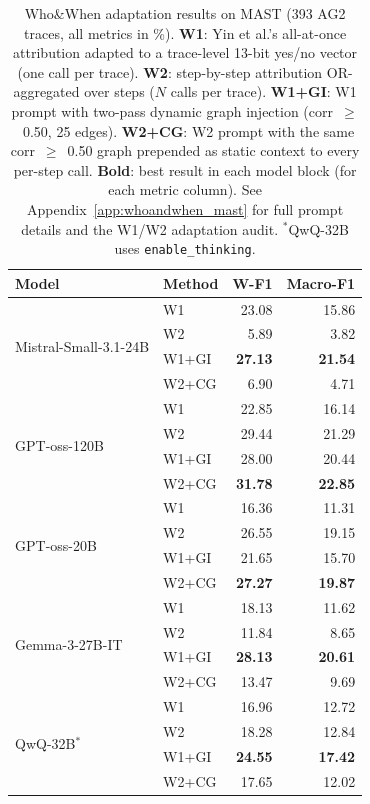 \begin{table}[t]
\centering
\small
\setlength{\tabcolsep}{8pt}
\renewcommand{\arraystretch}{1.2}
\begin{tabular}{l l rr}
\toprule
\textbf{Model} & \textbf{Method} & \textbf{W-F1} & \textbf{Macro-F1} \\
\midrule
\multirow{4}{*}{Mistral-Small-3.1-24B}
  & W1     & 23.08              & 15.86              \\
  & W2     &  5.89              &  3.82              \\
  & W1+GI  & \textbf{27.13}     & \textbf{21.54}     \\
  & W2+CG  &  6.90              &  4.71              \\[3pt]
\multirow{4}{*}{GPT-oss-120B}
  & W1     & 22.85              & 16.14              \\
  & W2     & 29.44              & 21.29              \\
  & W1+GI  & 28.00              & 20.44              \\
  & W2+CG  & \textbf{31.78}     & \textbf{22.85}     \\[3pt]
\multirow{4}{*}{GPT-oss-20B}
  & W1     & 16.36              & 11.31              \\
  & W2     & 26.55              & 19.15              \\
  & W1+GI  & 21.65              & 15.70              \\
  & W2+CG  & \textbf{27.27}     & \textbf{19.87}     \\[3pt]
\multirow{4}{*}{Gemma-3-27B-IT}
  & W1     & 18.13              & 11.62              \\
  & W2     & 11.84              &  8.65              \\
  & W1+GI  & \textbf{28.13}     & \textbf{20.61}     \\
  & W2+CG  & 13.47              &  9.69              \\[3pt]
\multirow{4}{*}{QwQ-32B$^{*}$}
  & W1     & 16.96              & 12.72              \\
  & W2     & 18.28              & 12.84              \\
  & W1+GI  & \textbf{24.55}     & \textbf{17.42}     \\
  & W2+CG  & 17.65              & 12.02              \\
\bottomrule
\end{tabular}
\caption{%
  Who\&When adaptation results on MAST (393 AG2 traces, all metrics in \%).
  \textbf{W1}: Yin et al.'s all-at-once attribution adapted to a
  trace-level 13-bit yes/no vector (one call per trace).
  \textbf{W2}: step-by-step attribution OR-aggregated over steps
  ($N$ calls per trace).
  \textbf{W1+GI}: W1 prompt with two-pass dynamic graph injection
  (corr~$\geq$~0.50, 25 edges).
  \textbf{W2+CG}: W2 prompt with the same corr~$\geq$~0.50 graph prepended as
  static context to every per-step call.
  \textbf{Bold}: best result in each model block (for each metric column).
  See Appendix~\ref{app:whoandwhen_mast} for full prompt details and
  the W1/W2 adaptation audit.
  $^{*}$QwQ-32B uses \texttt{enable\_thinking}.%
}
\label{tab:mast_who_and_when}
\end{table}
